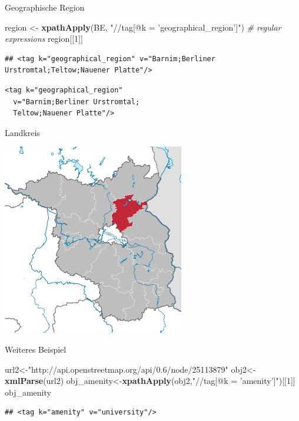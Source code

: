 \documentclass[ignorenonframetext,]{beamer}
\newenvironment{Shaded}{\begin{snugshade}}{\end{snugshade}}
\newcommand{\KeywordTok}[1]{\textcolor[rgb]{0.13,0.29,0.53}{\textbf{#1}}}
\newcommand{\DecValTok}[1]{\textcolor[rgb]{0.00,0.00,0.81}{#1}}
\newcommand{\StringTok}[1]{\textcolor[rgb]{0.31,0.60,0.02}{#1}}
\newcommand{\CommentTok}[1]{\textcolor[rgb]{0.56,0.35,0.01}{\textit{#1}}}
\newcommand{\NormalTok}[1]{#1}
\begin{document}
\begin{frame}[fragile]{Geographische Region}

\begin{Shaded}
\begin{Highlighting}[]
\NormalTok{region <-}\StringTok{ }\KeywordTok{xpathApply}\NormalTok{(BE,}
  \StringTok{"//tag[@k = 'geographical_region']"}\NormalTok{)}
\CommentTok{# regular expressions}
\NormalTok{region[[}\DecValTok{1}\NormalTok{]]}
\end{Highlighting}
\end{Shaded}

\begin{verbatim}
## <tag k="geographical_region" v="Barnim;Berliner Urstromtal;Teltow;Nauener Platte"/>
\end{verbatim}

\begin{verbatim}
<tag k="geographical_region" 
  v="Barnim;Berliner Urstromtal;
  Teltow;Nauener Platte"/>
\end{verbatim}

\end{frame}

\begin{frame}{Landkreis}

\includegraphics{figure/Barnim.png}

\end{frame}

\begin{frame}[fragile]{Weiteres Beispiel}

\begin{Shaded}
\begin{Highlighting}[]
\NormalTok{url2<-}\StringTok{"http://api.openstreetmap.org/api/0.6/node/25113879"}
\NormalTok{obj2<-}\KeywordTok{xmlParse}\NormalTok{(url2)}
\NormalTok{obj_amenity<-}\KeywordTok{xpathApply}\NormalTok{(obj2,}\StringTok{"//tag[@k = 'amenity']"}\NormalTok{)[[}\DecValTok{1}\NormalTok{]]}
\NormalTok{obj_amenity}
\end{Highlighting}
\end{Shaded}

\begin{verbatim}
## <tag k="amenity" v="university"/>
\end{verbatim}

\end{frame}
\end{document}
